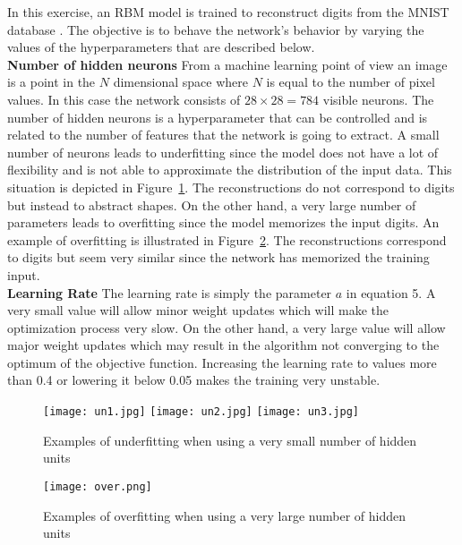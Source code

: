 \documentclass[conference,compsoc]{IEEEtran}
\begin{document}
In this exercise, an RBM model is trained to reconstruct digits from the MNIST database \cite{mnist}. The objective is to behave the network's behavior by varying the values of the hyperparameters that are described below.
\\
\textbf{Number of hidden neurons}
From a machine learning point of view an image is a point in the $N$ dimensional space where $N$ is equal to the number of pixel values. In this case the network consists of $28 \times 28 = 784 $ visible neurons. The number of hidden neurons is a hyperparameter that can be controlled and is related to the number of features that the network is going to extract. A small number of neurons leads to underfitting since the model does not have a lot of flexibility and is not able to approximate the distribution of the input data. This situation is depicted in Figure~\ref{fig:rbm}. The reconstructions do not correspond to digits but instead to abstract shapes. On the other hand, a very large number of parameters leads to overfitting since the model memorizes the input digits. An example of overfitting is illustrated in Figure~\ref{fig:rbm2}. The reconstructions correspond to digits but seem very similar since the network has memorized the training input.
\\
\textbf{Learning Rate} The learning rate is simply the parameter $a$ in equation 5. A very small value will allow minor weight updates which will make the optimization process very slow. On the other hand, a very large value will allow major weight updates which may result in the algorithm not converging to the optimum of the objective function.
Increasing the learning rate to values more than 0.4 or lowering it below 0.05 makes the training very unstable.

\begin{figure}[!htb]
\centering
{}
  \texttt{[image: un1.jpg]}
\endminipage
\vspace{1mm}
  \texttt{[image: un2.jpg]}
\endminipage
\vspace{1mm}
%
  \texttt{[image: un3.jpg]}
\endminipage

\caption{Examples of underfitting when using a very small number of hidden units}
\label{fig:rbm}
\end{figure}



\begin{figure}[!htb]
\centering
\minipage{8cm}
  \texttt{[image: over.png]}
\endminipage

\caption{Examples of overfitting when using a very large number of hidden units}
\label{fig:rbm2}
\end{figure}
\end{document}
